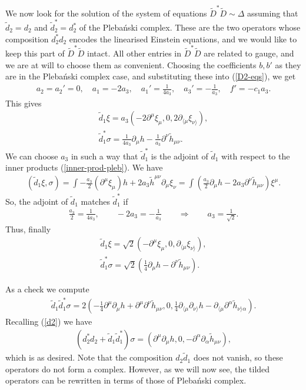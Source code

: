 \documentclass[10pt]{report}
\newcommand{\pleb}[0]{Pleba\'nski}
\theoremstyle{definition}
\begin{document}
We now look for the solution of the system of equations $\tilde{D}^* \tilde{D}\sim\Delta$ assuming that $\tilde{d}_2=d_2$ and $\tilde{d}_2^* = d_2^*$ of the \pleb{} complex. These are the two operators whose composition $d_2^* d_2$ encodes the linearised Einstein equations, and we would like to keep this part of $\tilde{D}^*\tilde{D}$ intact. All other entries in $\tilde{D}^*\tilde{D}$ are related to gauge, and we are at will to choose them as convenient. Choosing the coefficients $b,b'$ as they are in the \pleb{} complex case, and substituting these into (\ref{D2-eqs}), we get 
\begin{align}
a_2= a_2'=0, \quad a_1=-2a_3, \quad a_1'= \frac{1}{4a_3}, \quad a_3'=-\frac{1}{a_3}, \quad f' = - c_1 a_3.
\end{align}
This gives
\begin{align}
\tilde{d}_1 \xi = a_3 ( - 2\partial^\mu \xi_\mu, 0, 2\partial_{\langle\mu} \xi_{\nu\rangle} ), \\ \nonumber
\tilde{d}_1^* \sigma =  \frac{1}{4a_3} \partial_\mu h - \frac{1}{a_3} \partial^\nu \tilde{h}_{\mu\nu}.
\end{align}
We can choose $a_3$ in such a way that $\tilde{d}_1^*$ is the adjoint of $\tilde{d}_1$ with respect to the inner products (\ref{inner-prod-pleb}). We have
\begin{align}
(\tilde{d}_1\xi,\sigma) = \int -\frac{a_3}{2} (\partial^\mu \xi_\mu) h + 2a_3 \tilde{h}^{\mu\nu} \partial_\mu \xi_\nu = \int ( \frac{a_3}{2} \partial_\mu h - 2a_3 \partial^\nu \tilde{h}_{\mu\nu}) \xi^\mu.
\end{align}
So, the adjoint of $\tilde{d}_1$ matches $\tilde{d}_1^*$ if 
\begin{align}
\frac{a_3}{2}= \frac{1}{4a_3}, \qquad - 2a_3 = - \frac{1}{a_3} \qquad \Rightarrow \qquad a_3=\frac{1}{\sqrt{2}}.
\end{align}
Thus, finally
\begin{align}\label{tilde-d1-d1*}
\tilde{d}_1 \xi = \sqrt{2} ( - \partial^\mu \xi_\mu, 0, \partial_{\langle\mu} \xi_{\nu\rangle} ), \\ \nonumber
\tilde{d}_1^* \sigma =  \sqrt{2}( \frac{1}{4} \partial_\mu h -  \partial^\nu \tilde{h}_{\mu\nu}).
\end{align}

As a check we compute
\begin{align}
\tilde{d}_1 \tilde{d}_1^* \sigma = 2( - \frac{1}{4}\partial^\mu \partial_\mu h + \partial^\mu \partial^\nu \tilde{h}_{\mu\nu}, 0, \frac{1}{4} \partial_{\langle\mu} \partial_{\nu\rangle} h -  \partial_{\langle \mu} \partial^\alpha \tilde{h}_{\nu\rangle\alpha}).
\end{align}
Recalling (\ref{d2}) we have
\begin{align}
(d_2^* d_2 + \tilde{d}_1 \tilde{d}_1^*)\sigma = (\partial^\mu \partial_\mu h, 0, - \partial^\alpha \partial_\alpha \tilde{h}_{\mu\nu}),
\end{align}
which is as desired. Note that the composition $d_2 \tilde{d}_1$ does not vanish, so these operators do not form a complex. However, as we will now see, the tilded operators can be rewritten in terms of those of \pleb{} complex. 
\end{document}
